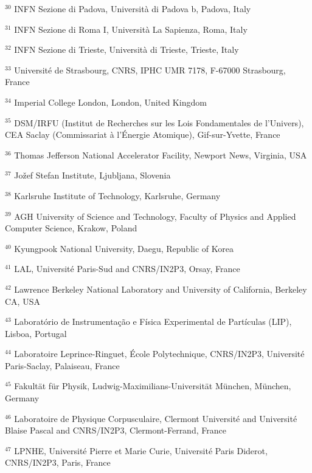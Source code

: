\par {\footnotesize $^{30}$ INFN Sezione di Padova, Università di Padova b, Padova, Italy}
\par {\footnotesize $^{31}$ INFN Sezione di Roma I, Università La Sapienza, Roma, Italy}
\par {\footnotesize $^{32}$ INFN Sezione di Trieste, Università di Trieste, Trieste, Italy}
\par {\footnotesize $^{33}$ Université de Strasbourg, CNRS, IPHC UMR 7178, F-67000 Strasbourg, France}
\par {\footnotesize $^{34}$ Imperial College London, London, United Kingdom}
\par {\footnotesize $^{35}$ DSM/IRFU (Institut de Recherches sur les Lois Fondamentales de l’Univers), CEA Saclay (Commissariat à l’Énergie Atomique), Gif-sur-Yvette, France}
\par {\footnotesize $^{36}$ Thomas Jefferson National Accelerator Facility, Newport News, Virginia, USA}
\par {\footnotesize $^{37}$ Jožef Stefan Institute, Ljubljana, Slovenia}
\par {\footnotesize $^{38}$ Karlsruhe Institute of Technology, Karlsruhe, Germany}
\par {\footnotesize $^{39}$ AGH University of Science and Technology, Faculty of Physics and Applied Computer Science, Krakow, Poland}
\par {\footnotesize $^{40}$ Kyungpook National University, Daegu, Republic of Korea}
\par {\footnotesize $^{41}$ LAL, Université Paris-Sud and CNRS/IN2P3, Orsay, France}
\par {\footnotesize $^{42}$ Lawrence Berkeley National Laboratory and University of California, Berkeley CA, USA}
\par {\footnotesize $^{43}$ Laboratório de Instrumentação e Física Experimental de Partículas (LIP), Lisboa, Portugal}
\par {\footnotesize $^{44}$ Laboratoire Leprince-Ringuet, École Polytechnique, CNRS/IN2P3, Université Paris-Saclay, Palaiseau, France}
\par {\footnotesize $^{45}$ Fakultät für Physik, Ludwig-Maximilians-Universität München, München, Germany}
\par {\footnotesize $^{46}$ Laboratoire de Physique Corpusculaire, Clermont Université and Université Blaise Pascal and CNRS/IN2P3, Clermont-Ferrand, France}
\par {\footnotesize $^{47}$ LPNHE, Université Pierre et Marie Curie, Université Paris Diderot, CNRS/IN2P3, Paris, France}
